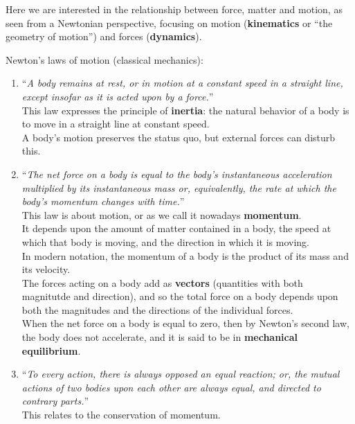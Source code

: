 Here we are interested in the relationship between force, matter and motion, as seen from a Newtonian perspective, focusing on motion (\textbf{kinematics} or ``the geometry of motion'') and forces (\textbf{dynamics}).

Newton's laws of motion (classical mechanics):

\begin{enumerate}
    \item ``\textit{A body remains at rest, or in motion at a constant speed in a straight line, except insofar as it is acted upon by a force.}'' \\
    This law expresses the principle of \textbf{\gls{inertia}}: the natural behavior of a body is to move in a straight line at constant speed. \\
    A body's motion preserves the status quo, but external forces can disturb this.
    \item ``\textit{The net force on a body is equal to the body's instantaneous acceleration multiplied by its instantaneous mass or, equivalently, the rate at which the body's momentum changes with time.}'' \\
    This law is about motion, or as we call it nowadays \textbf{\gls{momentum}}. \\
    It depends upon the amount of matter contained in a body, the speed at which that body is moving, and the direction in which it is moving. \\
    In modern notation, the momentum of a body is the product of its mass and its velocity. \\
    The forces acting on a body add as \textbf{\gls{vector}s} (quantities with both magnitutde and direction), and so the total force on a body depends upon both the magnitudes and the directions of the individual forces. \\
    When the net force on a body is equal to zero, then by Newton's second law, the body does not accelerate, and it is said to be in \textbf{mechanical equilibrium}.
    \item ``\textit{To every action, there is always opposed an equal reaction; or, the mutual actions of two bodies upon each other are always equal, and directed to contrary parts.}'' \\
    This relates to the conservation of momentum.
\end{enumerate}


